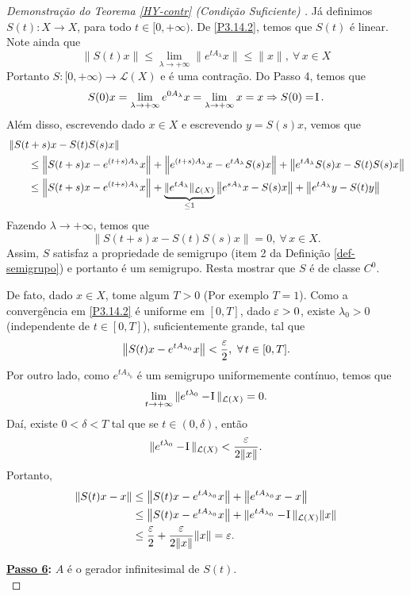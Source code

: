 \begin{proof}[Demonstração do Teorema {\ref{HY-contr}} (Condição Suficiente) ]
Já definimos $S(t):X\to X$, para todo $t\in [0,+\infty)$. De \eqref{P3.14.2}, 
temos que $S(t)$ é linear. Note ainda  que
\begin{equation*}
\|S(t)x\|\leq \lim\limits_{\lambda \to +\infty} \|e^{tA_\lambda}x\|\leq \|x\|,\ 
\forall\, x\in X
\end{equation*}
Portanto $S:[0,+\infty)\to \mathcal{L}(X)$ e é uma contração. Do Passo 4, temos 
que
\[
S(0)x=\lim_{\lambda \to +\infty} e^{0A_\lambda}x
=\lim_{\lambda \to +\infty} x= x\Rightarrow S(0)=\operatorname{\!I}.
\]
Além disso, escrevendo dado $x\in X$ e escrevendo $y=S(s)x$, vemos que
\begin{align*}
& \left\| S(t+s)x-S(t)S(s)x \right\| \\
& \qquad \leq \left\| S(t+s)x-e^{(t+s)A_\lambda}x \right\|
+\left\| e^{(t+s)A_\lambda}x - e^{tA_\lambda}S(s)x\right\|
+\left\|e^{tA_\lambda}S(s)x-S(t)S(s)x\right\|\\
& \qquad \leq \left\| S(t+s)x-e^{(t+s)A_\lambda}x \right\|
+\underbrace{\|e^{tA_\lambda}\|_{\mathcal{L}(X)}}_{\leq 1} \left\| e^{sA_\lambda}x - S(s)x\right\|
+\left\|e^{tA_\lambda}y-S(t)y\right\|
\end{align*}
Fazendo $\lambda \to +\infty$, temos que
\begin{equation*}
\left\| S(t+s)x-S(t)S(s)x \right\| = 0,\ \forall\, x\in X.
\end{equation*}
Assim, $S$ satisfaz a propriedade de semigrupo (item 2 da Definição 
\ref{def-semigrupo}) e portanto é um semigrupo. Resta mostrar que $S$ é de classe 
$C^0$. 

De fato, dado $x\in X$, tome algum $T>0$ (Por exemplo $T=1$). Como a convergência em 
\eqref{P3.14.2} é uniforme em $[0,T]$, dado $\varepsilon>0$, existe $\lambda_0>0$
(independente de $t\in [0,T]$), suficientemente grande, tal que 
\begin{equation*}
\left\|S(t)x-e^{tA_{\lambda_0}}x \right\|< \frac{\varepsilon}{2},\ \forall\, t\in [0,T].
\end{equation*}
Por outro lado, como $e^{tA_{\lambda_0}}$ é um semigrupo uniformemente contínuo, temos que 
\begin{equation*}
\lim\limits_{t\to +\infty} \|e^{t\lambda_0}-\operatorname{\!I}\|_{\mathcal{L}(X)}=0.
\end{equation*}
Daí, existe $0<\delta<T$ tal que se $t\in (0,\delta)$, então
\begin{equation*}
\|e^{t\lambda_0}-\operatorname{\!I}\|_{\mathcal{L}(X)}<\frac{\varepsilon}{2\|x\|}.
\end{equation*}
Portanto,
\begin{align*}
\left\|S(t)x-x \right\|
& \leq
 \left\|S(t)x-e^{tA_{\lambda_0}}x \right\| 
+\left\|e^{tA_{\lambda_0}}x - x\right\|\\
&\leq  \left\|S(t)x-e^{tA_{\lambda_0}}x \right\|
 + \|e^{tA_{\lambda_0}}- \operatorname{\!I}\|_{\mathcal{L}(X)}\|x\|\\
&\leq  \frac{\varepsilon}{2}+\frac{\varepsilon}{2\|x\|}\|x\|=\varepsilon.
\end{align*}


\noindent\textbf{\underline{Passo 6}:} $A$ é o gerador infinitesimal de $S(t)$.
\\


\end{proof}










